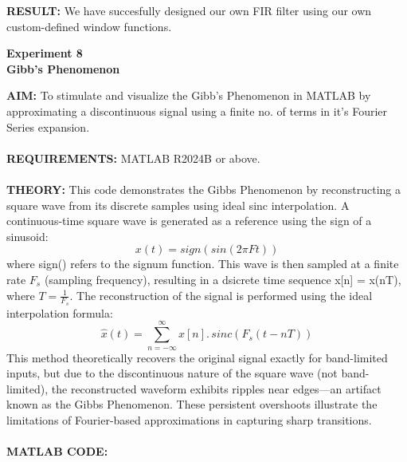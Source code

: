 \documentclass[12pt]{report}
\begin{document}
  \textbf{RESULT:} We have succesfully designed our own FIR filter using our own custom-defined window functions.
 
  \newpage 
  \begin{center}
    \textbf{\LARGE Experiment 8} \\
    \vspace{0.2cm}
    \textbf{\large Gibb's Phenomenon}
  \end{center}
  \noindent \textbf{AIM:} To stimulate and visualize the Gibb's Phenomenon in MATLAB by approximating a discontinuous signal using a finite no. of terms in it's Fourier Series expansion. \\ \\
  \textbf{REQUIREMENTS:} MATLAB R2024B or above. \\ \\
  \textbf{THEORY:} This code demonstrates the Gibbs Phenomenon by reconstructing a square wave from its discrete samples using ideal sinc interpolation. A continuous-time square wave is generated as a reference using the sign of a sinusoid: \[ x(t) = sign(sin(2 \pi Ft)) \] where sign() refers to the signum function. This wave is then sampled at a finite rate $F_s$ (sampling frequency), resulting in a dsicrete time sequence x[n] = x(nT),  where $T = \frac{1}{F_s}$. The reconstruction of the signal is performed using the ideal interpolation formula: \[ \hat x (t) = \sum_{n = -\infty}^{\infty} x[n] . \, sinc (F_s (t - nT)) \] This method theoretically recovers the original signal exactly for band-limited inputs, but due to the discontinuous nature of the square wave (not band-limited), the reconstructed waveform exhibits ripples near edges—an artifact known as the Gibbs Phenomenon. These persistent overshoots illustrate the limitations of Fourier-based approximations in capturing sharp transitions. \cite{chatgpt}\\ \\
  \textbf{MATLAB CODE:}
\end{document}
